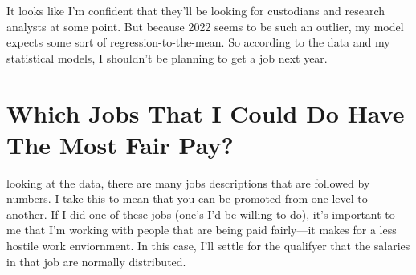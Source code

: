 \documentclass[11pt]{article}
\begin{document}
    It looks like I'm confident that they'll be looking for custodians and
research analysts at some point. But because 2022 seems to be such an
outlier, my model expects some sort of regression-to-the-mean. So
according to the data and my statistical models, I shouldn't be planning
to get a job next year.

\hypertarget{which-jobs-that-i-could-do-have-the-most-fair-pay}{%
\section{Which Jobs That I Could Do Have The Most Fair
Pay?}\label{which-jobs-that-i-could-do-have-the-most-fair-pay}}

looking at the data, there are many jobs descriptions that are followed
by numbers. I take this to mean that you can be promoted from one level
to another. If I did one of these jobs (one's I'd be willing to do),
it's important to me that I'm working with people that are being paid
fairly---it makes for a less hostile work enviornment. In this case,
I'll settle for the qualifyer that the salaries in that job are normally
distributed.
\end{document}
